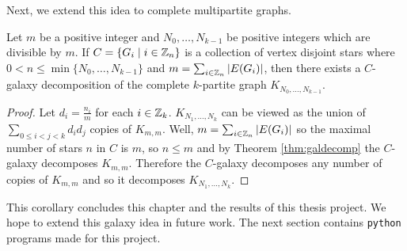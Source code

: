 Next, we extend this idea to complete multipartite graphs.
\begin{corollary}
Let $m$ be a positive integer and $N_{0},\hdots,N_{k-1}$ be positive integers which are divisible by $m$. If $C=\{G_{i}\mid i\in \mathbb{Z}_{n}\}$ is a collection of vertex disjoint stars where $0<n\leq \min\{N_{0},\hdots,N_{k-1}\}$ and $m=\sum_{i\in \mathbb{Z}_{n}} |E(G_{i})|$, then there exists a $C$-galaxy decomposition of the complete $k$-partite graph $K_{N_{0},\hdots,N_{k-1}}$.
\end{corollary}
\begin{proof}
Let $d_{i}=\frac{n_{i}}{m}$ for each $i\in \mathbb{Z}_{k}$. $K_{N_{1},\hdots,N_{k}}$ can be viewed as the union of $\sum\limits_{0\leq i<j<k} d_{i}d_{j}$ copies of $K_{m,m}$. Well, $m=\sum_{i\in \mathbb{Z}_{n}} |E(G_{i})|$ so the maximal number of stars $n$ in $C$ is $m$, so $n\leq m$ and by Theorem \ref{thm:galdecomp} the $C$-galaxy decomposes $K_{m,m}$. Therefore the $C$-galaxy decomposes any number of copies of $K_{m,m}$ and so it decomposes $K_{N_{1},\hdots,N_{k}}$.
\end{proof}
This corollary concludes this chapter and the results of this thesis project. We hope to extend this galaxy idea in future work. The next section contains \verb|python| programs made for this project.